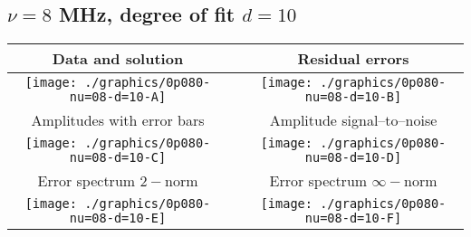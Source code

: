 

% 

\clearpage{}
\break{}

\subsection{$\nu = 8$ MHz, degree of fit $d = 10$}

\begin{table}[h]
    \begin{center}
        \begin{tabular}{ccc}
            Data and solution & \quad & Residual errors \\\hline
            \texttt{[image: ./graphics/0p080-nu=08-d=10-A]} &&
            \texttt{[image: ./graphics/0p080-nu=08-d=10-B]} \\[15pt]
            Amplitudes with error bars && Amplitude signal--to--noise \\\hline
            \texttt{[image: ./graphics/0p080-nu=08-d=10-C]} &&
            \texttt{[image: ./graphics/0p080-nu=08-d=10-D]} \\[15pt]
            Error spectrum $2-$norm && Error spectrum $\infty-$norm \\\hline
            \texttt{[image: ./graphics/0p080-nu=08-d=10-E]} &&
            \texttt{[image: ./graphics/0p080-nu=08-d=10-F]} \\[15pt]
        \end{tabular}
    \end{center}
\label{fig:elev=80, nu=8}
\end{table}



\endinput
